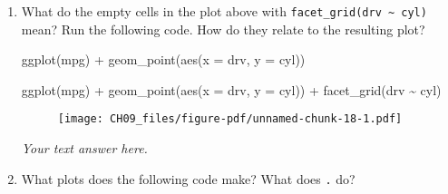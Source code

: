 \documentclass[
  letterpaper,
  DIV=11,
  numbers=noendperiod]{scrreprt}
\newenvironment{Shaded}{\begin{snugshade}}{\end{snugshade}}
\newcommand{\AttributeTok}[1]{\textcolor[rgb]{0.40,0.45,0.13}{#1}}
\newcommand{\FunctionTok}[1]{\textcolor[rgb]{0.28,0.35,0.67}{#1}}
\newcommand{\NormalTok}[1]{\textcolor[rgb]{0.00,0.23,0.31}{#1}}
\newcommand{\SpecialCharTok}[1]{\textcolor[rgb]{0.37,0.37,0.37}{#1}}
\begin{document}
\begin{enumerate}
\begin{tcolorbox}
\begin{figure}[H]
{  }

  \end{figure}

  \end{tcolorbox}
\item
  What do the empty cells in the plot above with
  \texttt{facet\_grid(drv\ \textasciitilde{}\ cyl)} mean? Run the
  following code. How do they relate to the resulting plot?

\begin{Shaded}
\begin{Highlighting}[]
\FunctionTok{ggplot}\NormalTok{(mpg) }\SpecialCharTok{+} 
  \FunctionTok{geom\_point}\NormalTok{(}\FunctionTok{aes}\NormalTok{(}\AttributeTok{x =}\NormalTok{ drv, }\AttributeTok{y =}\NormalTok{ cyl))}
\end{Highlighting}
\end{Shaded}

  \begin{tcolorbox}[enhanced jigsaw, breakable, bottomtitle=1mm, left=2mm, colback=white, toprule=.15mm, leftrule=.75mm, colframe=quarto-callout-note-color-frame, colbacktitle=quarto-callout-note-color!10!white, title={Answer}, coltitle=black, toptitle=1mm, bottomrule=.15mm, opacitybacktitle=0.6, arc=.35mm, rightrule=.15mm, titlerule=0mm, opacityback=0]

\begin{Shaded}
\begin{Highlighting}[]
\FunctionTok{ggplot}\NormalTok{(mpg) }\SpecialCharTok{+} 
  \FunctionTok{geom\_point}\NormalTok{(}\FunctionTok{aes}\NormalTok{(}\AttributeTok{x =}\NormalTok{ drv, }\AttributeTok{y =}\NormalTok{ cyl)) }\SpecialCharTok{+}
  \FunctionTok{facet\_grid}\NormalTok{(drv }\SpecialCharTok{\textasciitilde{}}\NormalTok{ cyl)}
\end{Highlighting}
\end{Shaded}

  \begin{figure}[H]

  {\centering \texttt{[image: CH09\_files/figure-pdf/unnamed-chunk-18-1.pdf]}

  }

  \end{figure}

  \emph{Your text answer here.}

  \end{tcolorbox}
\item
  What plots does the following code make? What does \texttt{.} do?


\end{enumerate}
\end{document}
